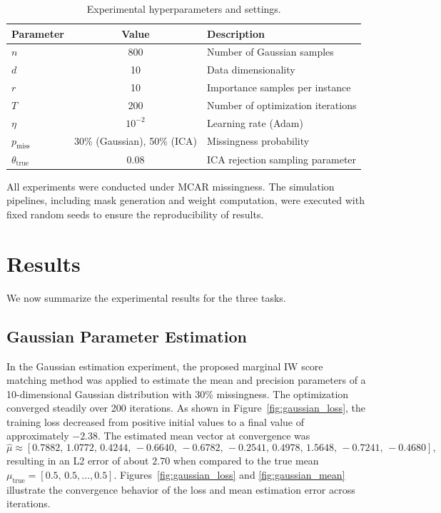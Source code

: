 \documentclass{article}
\begin{document}
\begin{table}[h]
\centering
\begin{tabular}{lcl}
\hline
\textbf{Parameter} & \textbf{Value} & \textbf{Description} \\
\hline
$n$ & 800 & Number of Gaussian samples \\
$d$ & 10 & Data dimensionality \\
$r$ & 10 & Importance samples per instance \\
$T$ & 200 & Number of optimization iterations \\
$\eta$ & $10^{-2}$ & Learning rate (Adam) \\
$p_{\text{miss}}$ & 30\% (Gaussian), 50\% (ICA) & Missingness probability \\
$\theta_{\text{true}}$ & 0.08 & ICA rejection sampling parameter \\
\hline
\end{tabular}
\caption{Experimental hyperparameters and settings.}
\label{tab:exp}
\end{table}

All experiments were conducted under MCAR missingness. The simulation pipelines, including mask generation and weight computation, were executed with fixed random seeds to ensure the reproducibility of results.

\section{Results}
We now summarize the experimental results for the three tasks.

\subsection{Gaussian Parameter Estimation}
In the Gaussian estimation experiment, the proposed marginal IW score matching method was applied to estimate the mean and precision parameters of a 10-dimensional Gaussian distribution with 30\% missingness. The optimization converged steadily over 200 iterations. As shown in Figure~\ref{fig:gaussian_loss}, the training loss decreased from positive initial values to a final value of approximately $-2.38$. The estimated mean vector at convergence was
\[
\hat{\mu} \approx [0.7882,\,1.0772,\,0.4244,\,-0.6640,\,-0.6782,\,-0.2541,\,0.4978,\,1.5648,\,-0.7241,\,-0.4680],
\]
resulting in an L2 error of about $2.70$ when compared to the true mean $\mu_{\text{true}}=[0.5,\,0.5,\dots,0.5]$. Figures~\ref{fig:gaussian_loss} and \ref{fig:gaussian_mean} illustrate the convergence behavior of the loss and mean estimation error across iterations.
\end{document}
